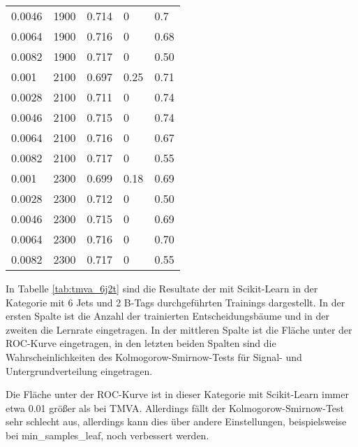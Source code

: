 \begin{table}[tbp]
\begin{center}
\begin{tabular}{lllll}
\num{0,0046} & \num{1900} & \num{0,714} & \num{0}    & \num{0,7}\\
\num{0,0064} & \num{1900} & \num{0,716} & \num{0}    & \num{0,68}\\
\num{0,0082} & \num{1900} & \num{0,717} & \num{0}    & \num{0,50}\\
\num{0,001}  & \num{2100} & \num{0,697} & \num{0,25} & \num{0,71}\\
\num{0,0028} & \num{2100} & \num{0,711} & \num{0}    & \num{0,74}\\
\num{0,0046} & \num{2100} & \num{0,715} & \num{0}    & \num{0,74}\\
\num{0,0064} & \num{2100} & \num{0,716} & \num{0}    & \num{0,67}\\
\num{0,0082} & \num{2100} & \num{0,717} & \num{0}    & \num{0,55}\\
\num{0,001}  & \num{2300} & \num{0,699} & \num{0,18} & \num{0,69}\\
\num{0,0028} & \num{2300} & \num{0,712} & \num{0}    & \num{0,50}\\
\num{0,0046} & \num{2300} & \num{0,715} & \num{0}    & \num{0,69}\\
\num{0,0064} & \num{2300} & \num{0,716} & \num{0}    & \num{0,70}\\
\num{0,0082} & \num{2300} & \num{0,717} & \num{0}    & \num{0,55}\\
  \hline
  \end{tabular}
  \end{center}
\end{table}

In Tabelle \ref{tab:tmva_6j2t} sind die Resultate der mit Scikit-Learn in der Kategorie mit 6 Jets und 2 B-Tags  durchgef\"uhrten Trainings dargestellt. In der ersten Spalte ist die Anzahl der trainierten Entscheidungsb\"aume und in der zweiten die Lernrate eingetragen. In der mittleren Spalte ist die Fl\"ache unter der ROC-Kurve eingetragen, in den letzten beiden Spalten sind die Wahrscheinlichkeiten des Kolmogorow-Smirnow-Tests f\"ur Signal- und Untergrundverteilung eingetragen.

Die Fl\"ache unter der ROC-Kurve ist in dieser Kategorie mit Scikit-Learn immer etwa \num{0,01} gr\"o\ss er als bei TMVA. Allerdings f\"allt der Kolmogorow-Smirnow-Test sehr schlecht aus, allerdings kann dies über andere Einstellungen, beispielsweise bei min\_samples\_leaf, noch verbessert werden.

